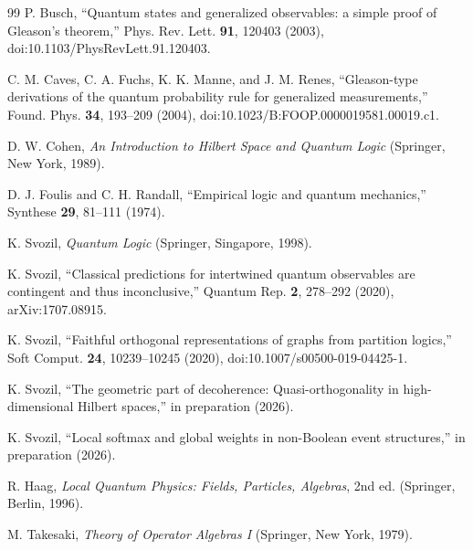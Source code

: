 \documentclass[
aps,
pra,
reprint,
superscriptaddress,
nofootinbib,
longbibliography
]{revtex4-2}
\begin{document}
\begin{thebibliography}{99}
P. Busch,
``Quantum states and generalized observables: a simple proof of Gleason's theorem,''
Phys. Rev. Lett. \textbf{91}, 120403 (2003),
doi:10.1103/PhysRevLett.91.120403.

C. M. Caves, C. A. Fuchs, K. K. Manne, and J. M. Renes,
``Gleason-type derivations of the quantum probability rule for generalized measurements,''
Found. Phys. \textbf{34}, 193--209 (2004),
doi:10.1023/B:FOOP.0000019581.00019.c1.

D. W. Cohen,
\emph{An Introduction to Hilbert Space and Quantum Logic}
(Springer, New York, 1989).

D. J. Foulis and C. H. Randall,
``Empirical logic and quantum mechanics,''
Synthese \textbf{29}, 81--111 (1974).

K. Svozil,
\emph{Quantum Logic}
(Springer, Singapore, 1998).

K. Svozil,
``Classical predictions for intertwined quantum observables are contingent and thus inconclusive,''
Quantum Rep. \textbf{2}, 278--292 (2020), arXiv:1707.08915.

K. Svozil,
``Faithful orthogonal representations of graphs from partition logics,''
Soft Comput. \textbf{24}, 10239--10245 (2020),
doi:10.1007/s00500-019-04425-1.

K. Svozil,
``The geometric part of decoherence:
Quasi-orthogonality in high-dimensional Hilbert spaces,''
in preparation (2026).

K. Svozil,
``Local softmax and global weights in non-Boolean event structures,''
in preparation (2026).

R. Haag,
\emph{Local Quantum Physics: Fields, Particles, Algebras},
2nd ed. (Springer, Berlin, 1996).

M. Takesaki,
\emph{Theory of Operator Algebras I}
(Springer, New York, 1979).

\end{thebibliography}
\end{document}
